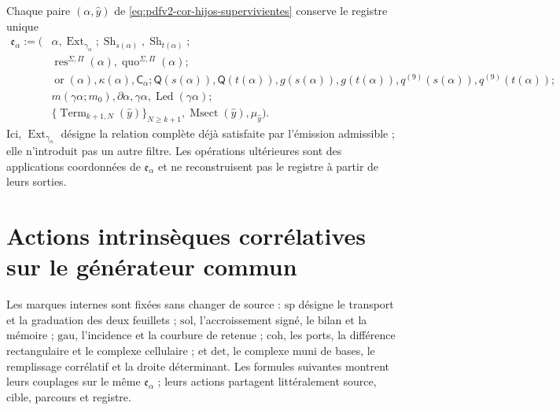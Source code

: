 Chaque paire \((\alpha,\widehat y)\) de \eqref{eq:pdfv2-cor-hijos-supervivientes} conserve le registre unique
\begin{equation}
\label{eq:pdfv2-cor-registro-extension}
 \begin{aligned}
 \mathfrak e_\alpha:=\bigl(&
 \alpha,\operatorname{Ext}_{\gamma_\alpha};
 \operatorname{Sh}_{s(\alpha)},\operatorname{Sh}_{t(\alpha)};\\
 &
 \operatorname{res}^{\Sigma,\Pi}(\alpha),
 \operatorname{quo}^{\Sigma,\Pi}(\alpha);\\
 &\operatorname{or}(\alpha),\kappa(\alpha),\mathsf C_\alpha;
 \mathsf Q(s(\alpha)),\mathsf Q(t(\alpha)),g(s(\alpha)),g(t(\alpha)),
 q^{(9)}(s(\alpha)),q^{(9)}(t(\alpha));\\
 &
 m(\gamma\alpha;m_0),\partial\alpha,\gamma\alpha,
 \operatorname{Led}(\gamma\alpha);\\
 &\{\operatorname{Term}_{k+1,N}(\widehat y)\}_{N\geq k+1},
 \operatorname{Msect}(\widehat y),\mu_{\widehat y}\bigr).
 \end{aligned}
\end{equation}
Ici, \(\operatorname{Ext}_{\gamma_\alpha}\) désigne la relation complète déjà satisfaite par l'émission admissible ; elle n'introduit pas un autre filtre. Les opérations ultérieures sont des applications coordonnées de \(\mathfrak e_\alpha\) et ne reconstruisent pas le registre à partir de leurs sorties.

\section{Actions intrinsèques corrélatives sur le générateur commun}

Les marques internes sont fixées sans changer de source : \(\mathrm{sp}\) désigne le transport et la graduation des deux feuillets ; \(\mathrm{sol}\), l'accroissement signé, le bilan et la mémoire ; \(\mathrm{gau}\), l'incidence et la courbure de retenue ; \(\mathrm{coh}\), les ports, la différence rectangulaire et le complexe cellulaire ; et \(\mathrm{det}\), le complexe muni de bases, le remplissage corrélatif et la droite déterminant. Les formules suivantes montrent leurs couplages sur le même \(\mathfrak e_\alpha\) ; leurs actions partagent littéralement source, cible, parcours et registre.


